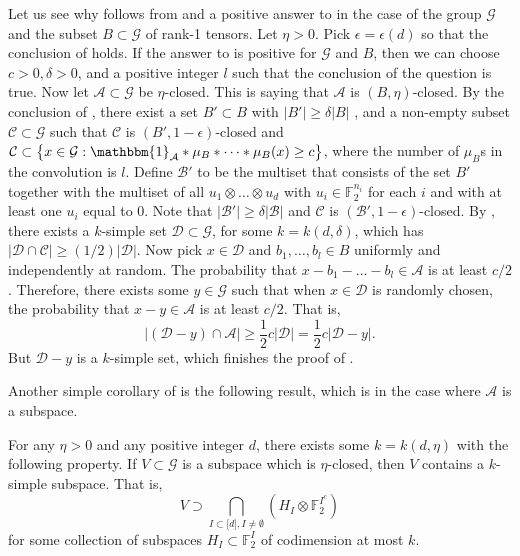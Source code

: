\documentclass{toc}
\newcommand\eps{\epsilon}  %
\newcommand\F{\mathbb{F}}
\renewcommand\d{\delta}
\newcommand{\ind}{\mathbbm{1}}
\newcommand \cA{\mathcal A}
\newcommand \cB{\mathcal B}
\newcommand \cC{\mathcal C}
\newcommand \cD{\mathcal D}
\newcommand \cG{\mathcal G}
\newcommand \s{\subset}
\begin{document}
\noindent Let us see why  follows from  and a positive answer to  in the case of the group $\cG$ and the subset $B\s\cG$ of rank-1 tensors. Let $\eta>0$. Pick $\eps=\eps(d)$ so that the conclusion of  holds. If the answer to  is positive for $\cG$ and $B$, then we can choose $c>0,\d>0$, and a positive integer $l$ such that the conclusion of the question is true. Now let $\cA\s \cG$ be $\eta$-closed. This is saying that $\cA$ is $(B,\eta)$-closed. By the conclusion of , there exist a set $B'\s B$ with $|B'|\geq \d|B|$ , and a non-empty subset $\cC\s \cG$ such that $\cC$ is $(B',1-\eps)$-closed and $\cC\subset \bigl\{x\in \cG: \ind_{\cA}*\mu_B*\dots*\mu_B(x)\geq c\bigr\}$, where the number of $\mu_B$s in the convolution is $l$. Define $\cB'$ to be the multiset that consists of the set $B'$ together with the multiset of all $u_1\otimes \dots \otimes u_d$ with $u_i\in \F_2^{n_i}$ for each $i$ and with at least one $u_i$ equal to $0$. Note that $|\cB'|\geq \d|\cB|$ and $\cC$ is $(\cB',1-\eps)$-closed. By , there exists a $k$-simple set $\cD\s \cG$, for some $k=k(d,\d)$, which has $|\cD\cap \cC|\geq ({1}/{2})|\cD|$. Now pick $x\in \cD$ and $b_1,\dots,b_l \in B$ uniformly and independently at random. The probability that $x-b_1-\dots-b_l\in \cA$ is at least $c/2$. Therefore, there exists some $y\in \cG$ such that when $x\in \cD$ is randomly chosen, the probability that $x-y\in \cA$ is at least $c/2$. That is,
\[
  |(\cD-y)\cap \cA|\geq \frac{1}{2}c|\cD|=\frac{1}{2}c|\cD-y|.
\]
But $\cD-y$ is a $k$-simple set, which finishes the proof of
.

Another simple corollary of  is the following result, which is  in the case where $\cA$ is a subspace.

\begin{corollary} \label{spacecorollary}
  For any $\eta>0$ and any positive integer $d$, there exists some $k=k(d,\eta)$ with the following property. If $V\s \cG$ is a subspace which is $\eta$-closed, then $V$ contains a $k$-simple subspace. That is,
  \[
    V\supset \bigcap_{I\s \lbrack d\rbrack,I\neq \emptyset}(H_I\otimes \F_2^{I^c})
  \]
  for some collection of subspaces $H_I\s \F_2^{I}$ of codimension at
  most $k$.
\end{corollary}
\end{document}
